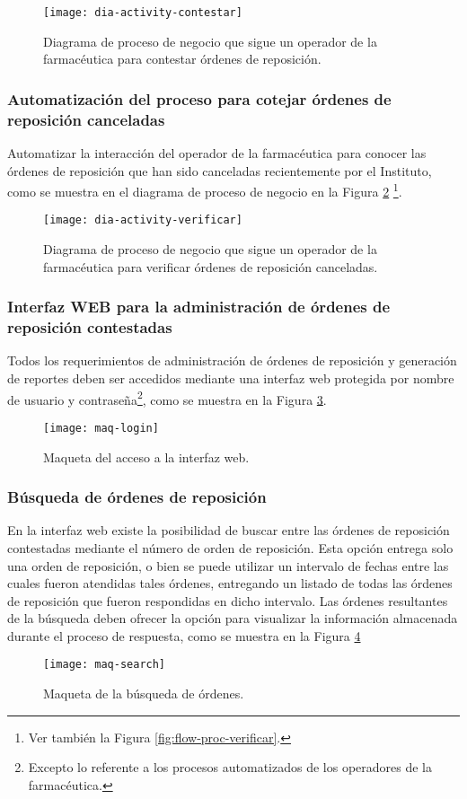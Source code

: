 \begin{figure}[h]
  \centering
  \texttt{[image: dia-activity-contestar]}
  \caption{Diagrama de proceso de negocio que sigue un operador de la farmacéutica para contestar órdenes de reposición.}
  \label{fig:dia-activity-contestar}
\end{figure}

\subsubsection{Automatización del proceso para cotejar órdenes de reposición canceladas}\label{sec:req-verificar}
Automatizar la interacción del operador de la farmacéutica para conocer las órdenes de reposición que han sido canceladas recientemente por el Instituto, como se muestra en el diagrama de proceso de negocio en la Figura \ref{fig:dia-activity-verificar} \footnote{
Ver también la Figura \ref{fig:flow-proc-verificar}.}.
\begin{figure}[h]
  \centering
  \texttt{[image: dia-activity-verificar]}
  \caption{Diagrama de proceso de negocio que sigue un operador de la farmacéutica para verificar órdenes de reposición canceladas.}
  \label{fig:dia-activity-verificar}
\end{figure}

\subsubsection{Interfaz WEB para la administración de órdenes de reposición contestadas}\label{sec:req-web-ui}
Todos los requerimientos de administración de órdenes de reposición y generación de reportes deben ser accedidos mediante una interfaz web protegida por nombre de usuario y contraseña\footnote{Excepto lo referente a los procesos automatizados de los operadores de la farmacéutica.}, como se muestra en la Figura \ref{fig:maq-login}.
\begin{figure}[h]
  \centering
  \texttt{[image: maq-login]} 
  \caption{Maqueta del acceso a la interfaz web.}
  \label{fig:maq-login}
\end{figure} 

\subsubsection{Búsqueda de órdenes de reposición}\label{sec:req-search}
En la interfaz web existe la posibilidad de buscar entre las órdenes de reposición contestadas mediante el número de orden de reposición. Esta opción entrega solo una orden de reposición, o bien se puede utilizar un intervalo de fechas entre las cuales fueron atendidas tales órdenes, entregando un listado de todas las órdenes de reposición que fueron respondidas en dicho intervalo. Las órdenes resultantes de la búsqueda deben ofrecer la opción para visualizar la información almacenada durante el proceso de respuesta, como se muestra en la Figura \ref{fig:maq-search}
\begin{figure}[h]
  \centering
  \texttt{[image: maq-search]} 
  \caption{Maqueta de la búsqueda de órdenes.}
  \label{fig:maq-search}
\end{figure} 

